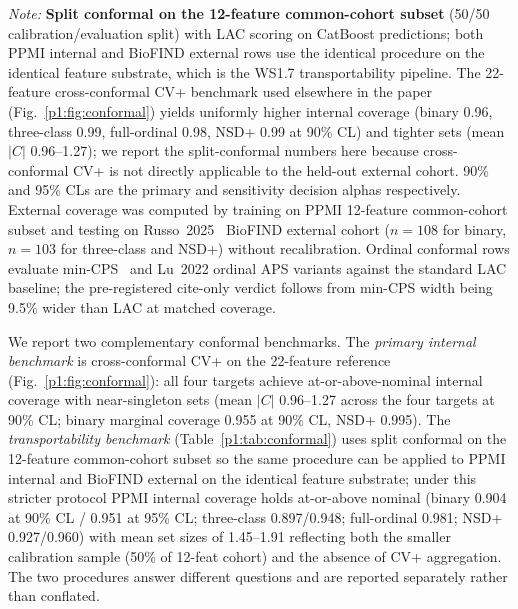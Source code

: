 \begin{table}[!t]
\raggedright\scriptsize\textit{Note:} \textbf{Split conformal on the 12-feature common-cohort subset} (50/50 calibration/evaluation split) with LAC scoring on CatBoost predictions; both PPMI internal and BioFIND external rows use the identical procedure on the identical feature substrate, which is the WS1.7 transportability pipeline. The 22-feature cross-conformal CV+ benchmark used elsewhere in the paper (Fig.~\ref{p1:fig:conformal}) yields uniformly higher internal coverage (binary 0.96, three-class 0.99, full-ordinal 0.98, NSD+ 0.99 at 90\% CL) and tighter sets (mean $|C|$ 0.96--1.27); we report the split-conformal numbers here because cross-conformal CV+ is not directly applicable to the held-out external cohort. 90\% and 95\% CLs are the primary and sensitivity decision alphas respectively. External coverage was computed by training on PPMI 12-feature common-cohort subset and testing on Russo~2025~\cite{russo2025} BioFIND external cohort ($n{=}108$ for binary, $n{=}103$ for three-class and NSD+) without recalibration. Ordinal conformal rows evaluate min-CPS~\cite{zhang2025ordinalcp} and Lu~2022 ordinal APS variants against the standard LAC baseline; the pre-registered cite-only verdict follows from min-CPS width being 9.5\% wider than LAC at matched coverage.
\end{table}

We report two complementary conformal benchmarks. The \emph{primary internal benchmark} is cross-conformal CV+ on the 22-feature reference (Fig.~\ref{p1:fig:conformal}): all four targets achieve at-or-above-nominal internal coverage with near-singleton sets (mean $|C|$ 0.96--1.27 across the four targets at 90\% CL; binary marginal coverage 0.955 at 90\% CL, NSD+ 0.995). The \emph{transportability benchmark} (Table~\ref{p1:tab:conformal}) uses split conformal on the 12-feature common-cohort subset so the same procedure can be applied to PPMI internal and BioFIND external on the identical feature substrate; under this stricter protocol PPMI internal coverage holds at-or-above nominal (binary 0.904 at 90\% CL / 0.951 at 95\% CL; three-class 0.897/0.948; full-ordinal 0.981; NSD+ 0.927/0.960) with mean set sizes of 1.45--1.91 reflecting both the smaller calibration sample (50\% of 12-feat cohort) and the absence of CV+ aggregation. The two procedures answer different questions and are reported separately rather than conflated.


